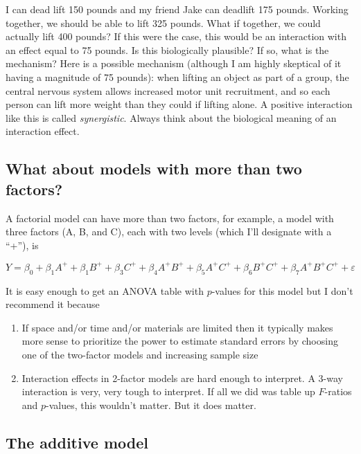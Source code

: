\documentclass[]{book}
\providecommand{\tightlist}{%
  \setlength{\itemsep}{0pt}\setlength{\parskip}{0pt}}
\theoremstyle{definition}
\theoremstyle{definition}
\theoremstyle{definition}
\theoremstyle{remark}
\begin{document}
I can dead lift 150 pounds and my friend Jake can deadlift 175 pounds.
Working together, we should be able to lift 325 pounds. What if
together, we could actually lift 400 pounds? If this were the case, this
would be an interaction with an effect equal to 75 pounds. Is this
biologically plausible? If so, what is the mechanism? Here is a possible
mechanism (although I am highly skeptical of it having a magnitude of 75
pounds): when lifting an object as part of a group, the central nervous
system allows increased motor unit recruitment, and so each person can
lift more weight than they could if lifting alone. A positive
interaction like this is called \emph{synergistic}. Always think about
the biological meaning of an interaction effect.

\subsection{What about models with more than two
factors?}\label{what-about-models-with-more-than-two-factors}

A factorial model can have more than two factors, for example, a model
with three factors (A, B, and C), each with two levels (which I'll
designate with a ``+''), is

\begin{equation}
Y = \beta_0 + \beta_1 A^+ + \beta_1 B^+ + \beta_3 C^+ + \beta_4 A^+ B^+ + \beta_5 A^+ C^+ + \beta_6 B^+ C^+ + \beta_7 A^+ B^+ C^+ + \varepsilon
\end{equation}

It is easy enough to get an ANOVA table with \(p\)-values for this model
but I don't recommend it because

\begin{enumerate}
\def\labelenumi{\arabic{enumi}.}
\tightlist
\item
  If space and/or time and/or materials are limited then it typically
  makes more sense to prioritize the power to estimate standard errors
  by choosing one of the two-factor models and increasing sample size
\item
  Interaction effects in 2-factor models are hard enough to interpret. A
  3-way interaction is very, very tough to interpret. If all we did was
  table up \(F\)-ratios and \(p\)-values, this wouldn't matter. But it
  does matter.
\end{enumerate}

\subsection{The additive model}\label{the-additive-model}
\end{document}
